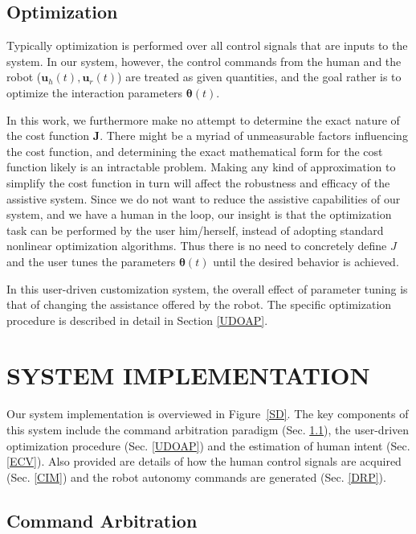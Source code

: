 \documentclass[letterpaper, 10 pt, journal, twoside]{IEEEtran}  %
\begin{document}
	\subsection{Optimization}
	Typically optimization is performed over all control signals that are inputs to the system. In our system, however, the control commands from the human and the robot ($ \boldsymbol{u}_h(t), \boldsymbol{u}_r(t)$) are treated as given quantities, and the goal rather is to optimize the interaction parameters $\boldsymbol{\theta}(t)$. 
	
	In this work, we furthermore make no attempt to determine the exact nature of the cost function $\boldsymbol{J}$. There might be a myriad of unmeasurable factors influencing the cost function, and determining the exact mathematical form for the cost function likely is an intractable problem. Making any kind of approximation to simplify the cost function in turn will affect the robustness and efficacy of the assistive system. Since we do not want to reduce the assistive capabilities of our system, and we have a human in the loop, our insight is that the optimization task can be performed by the user him/herself, instead of adopting standard nonlinear optimization algorithms. Thus there is no need to concretely define $J$ and the user tunes the parameters $\boldsymbol{\theta}(t)$ until the desired behavior is achieved. 
	
	In this user-driven customization system, the overall effect of parameter tuning is that of changing the assistance offered by the robot. The specific optimization procedure is described in detail in Section \ref{UDOAP}.	
	
	\section{SYSTEM IMPLEMENTATION} \label{si}
	
	
	Our system implementation is overviewed in Figure~\ref{SD}. 
	The key components of this system include the command arbitration paradigm (Sec. \ref{CA}),
	the user-driven optimization procedure (Sec. \ref{UDOAP}) and the estimation of human intent (Sec. \ref{ECV}).
	Also provided are details of how the human control signals are acquired (Sec. \ref{CIM}) and the robot autonomy
	commands are generated (Sec. \ref{DRP}). 
	
	\subsection{Command Arbitration} \label{CA}
	
\end{document}
